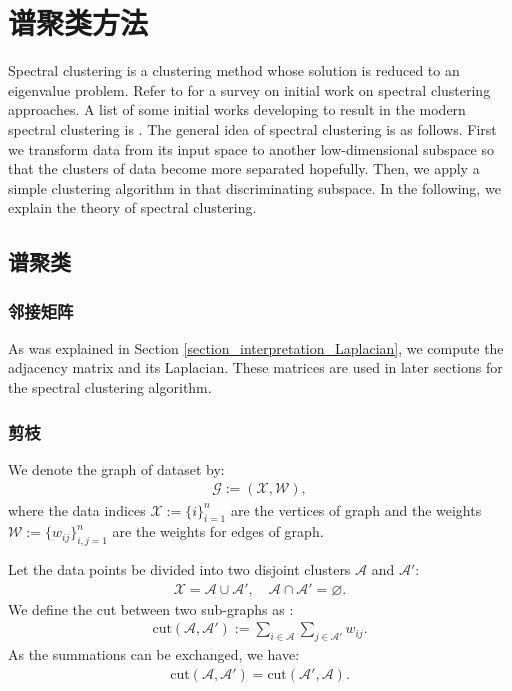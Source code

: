 \documentclass[lang=cn,10pt]{gorgeousnbook}
\numberwithin{equation}{section}%
\numberwithin{figure}{section}%
\begin{document}
\section{谱聚类方法}\label{section_spectral_clustering}

Spectral clustering \cite{weiss1999segmentation,ng2001spectral} is a clustering method whose solution is reduced to an eigenvalue problem. Refer to \cite{weiss1999segmentation} for a survey on initial work on spectral clustering approaches. A list of some initial works developing to result in the modern spectral clustering is \cite{scott1990feature,costeira1995multi,perona1998factorization,shi1997normalized,shi2000normalized}.
The general idea of spectral clustering is as follows. First we transform data from its input space to another low-dimensional subspace so that the clusters of data become more separated hopefully. Then, we apply a simple clustering algorithm in that discriminating subspace. In the following, we explain the theory of spectral clustering. 

\subsection{谱聚类}

\subsubsection{邻接矩阵}

As was explained in Section \ref{section_interpretation_Laplacian}, we compute the adjacency matrix and its Laplacian. These matrices are used in later sections for the spectral clustering algorithm. 

\subsubsection{剪枝}

We denote the graph of dataset by:
\begin{align}
\mathcal{G} := (\mathcal{X}, \mathcal{W}),
\end{align}
where the data indices $\mathcal{X} := \{i\}_{i=1}^n$ are the vertices of graph and the weights $\mathcal{W} := \{w_{ij}\}_{i,j=1}^n$ are the weights for edges of graph. 

Let the data points be divided into two disjoint clusters $\mathcal{A}$ and $\mathcal{A}'$:
\begin{align}
\mathcal{X} = \mathcal{A} \cup \mathcal{A}', \quad \mathcal{A} \cap \mathcal{A}' = \varnothing.
\end{align}
We define the cut between two sub-graphs as \cite{shi1997normalized,shi2000normalized}:
\begin{align}\label{equation_cut}
\text{cut}(\mathcal{A}, \mathcal{A}') := \sum_{i \in \mathcal{A}} \sum_{j \in \mathcal{A}'} w_{ij}.
\end{align}
As the summations can be exchanged, we have:
\begin{align}\label{equation_cut_symmetry}
\text{cut}(\mathcal{A}, \mathcal{A}') = \text{cut}(\mathcal{A}', \mathcal{A}).
\end{align}
\end{document}
